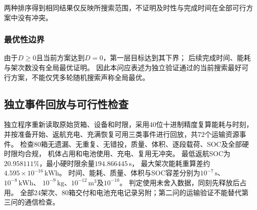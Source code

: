 两种排序得到相同结果仅反映所搜索范围，不证明及时性与完成时间在全部可行方案中没有冲突。

\subsubsection{最优性边界}
由于$D\geq0$且当前方案达到$D=0$，第一层目标达到其下界；
后续完成时间、能耗与架次数没有全局最优证明。
因此本问应表述为独立验证通过的当前搜索最好可行方案，不能仅凭多轮随机搜索声称全局最优。

\subsection{独立事件回放与可行性检查}
独立程序重新读取原始货箱、设备和时限，采用40位十进制精度复算能耗与时刻，
并按准备开始、返航充电、充满恢复可用三类事件进行回放，共72个运输资源事件。
检查80箱无遗漏、无重复、无错投，质量、体积、逐段载荷、SOC及全部硬时限均合规，
机体占用和电池使用、充电、复用无冲突。
最低返航SOC为$20.958111\%$，最小硬时限余量$194.866445\,\mathrm{s}$，
最大架次能耗重算差约$4.595\times10^{-16}\,\mathrm{kWh}$。
时间、能耗、质量、体积与SOC容差分别为$10^{-7}\,\mathrm{s}$、$10^{-8}\,\mathrm{kWh}$、
$10^{-9}\,\mathrm{kg}$、$10^{-12}\,\mathrm{m^3}$及$10^{-10}$。
判定使用未舍入数据，同刻先释放后占用。
全部24架次、80箱交付和电池充电记录另附；第二问的运输验证不能替代第三问的通信检查。
